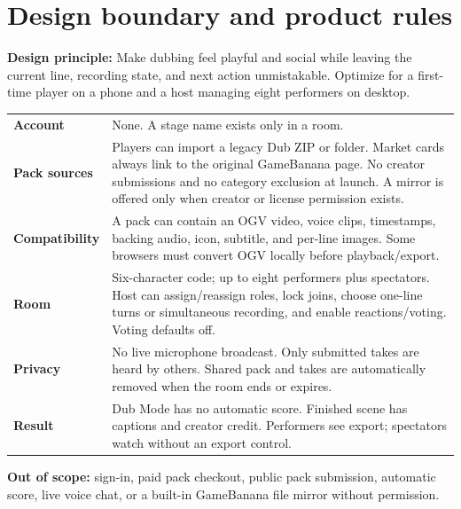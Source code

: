 \documentclass[10pt,a4paper]{article}
\begin{document}
\section{Design boundary and product rules}
\begin{callout}
\textbf{Design principle:} Make dubbing feel playful and social while leaving the current line, recording state, and next action unmistakable. Optimize for a first-time player on a phone and a host managing eight performers on desktop.
\end{callout}
\begin{tabularx}{\linewidth}{@{}>{\bfseries\color{teal}}p{35mm}X@{}}
Account & None. A stage name exists only in a room.\\
Pack sources & Players can import a legacy Dub ZIP or folder. Market cards always link to the original GameBanana page. No creator submissions and no category exclusion at launch. A mirror is offered only when creator or license permission exists.\\
Compatibility & A pack can contain an OGV video, voice clips, timestamps, backing audio, icon, subtitle, and per-line images. Some browsers must convert OGV locally before playback/export.\\
Room & Six-character code; up to eight performers plus spectators. Host can assign/reassign roles, lock joins, choose one-line turns or simultaneous recording, and enable reactions/voting. Voting defaults off.\\
Privacy & No live microphone broadcast. Only submitted takes are heard by others. Shared pack and takes are automatically removed when the room ends or expires.\\
Result & Dub Mode has no automatic score. Finished scene has captions and creator credit. Performers see export; spectators watch without an export control.\\
\end{tabularx}
\begin{riskbox}
\textbf{Out of scope:} sign-in, paid pack checkout, public pack submission, automatic score, live voice chat, or a built-in GameBanana file mirror without permission.
\end{riskbox}
\end{document}

